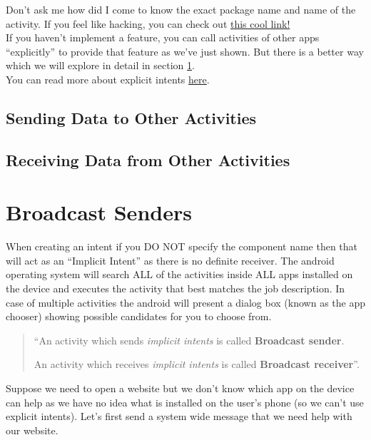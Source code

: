 Don't ask me how did I come to know the exact package name and name of the activity. If you feel like hacking, you can check out \href{http://stackoverflow.com/questions/12698814/get-launchable-activity-name-of-package-from-adb}{this cool link!} \\

If you haven't implement a feature, you can call activities of other apps ``explicitly'' to provide that feature as we've just shown. But there is a better way which we will explore in detail in section \ref{IBSR:broadcastSenders}. \\

You can read more about explicit intents \href{https://developer.android.com/guide/components/intents-filters.html#ExampleExplicit}{here}.

\subsection{Sending Data to Other Activities}

\subsection{Receiving Data from Other Activities}

\section{Broadcast Senders}
\label{IBSR:broadcastSenders}
When creating an intent if you DO NOT specify the component name then that will act as an ``Implicit Intent'' as there is no definite receiver. The android operating system will search ALL of the activities inside ALL apps installed on the device and executes the activity that best matches the job description. In case of multiple activities the android will present a dialog box (known as the app chooser) showing possible candidates for you to choose from. 

\begin{quote}
	``An activity which sends \textit{implicit intents} is called \textbf{Broadcast sender}. 
	
	An activity which receives \textit{implicit intents} is called \textbf{Broadcast receiver}''. 
\end{quote}

Suppose we need to open a website but we don't know which app on the device can help as we have no idea what is installed on the user's phone (so we can't use explicit intents). Let's first send a system wide message that we need help with our website. \\

